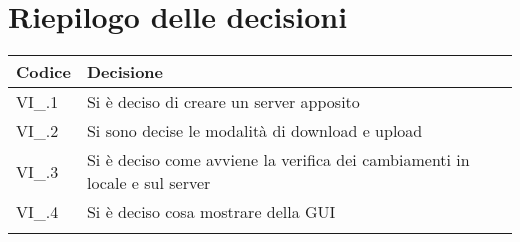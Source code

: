 \newpage

\section{Riepilogo delle decisioni \hfil}
{
	\setlength{\freewidth}{\dimexpr\textwidth-4\tabcolsep}
	\renewcommand{\arraystretch}{1.5}
	\setlength{\aboverulesep}{0pt}
	\setlength{\belowrulesep}{0pt}
	\begin{longtable}{L{.3\freewidth} L{.7\freewidth}}
		\toprule 
		\textbf{Codice} & \textbf{Decisione}\\
		\toprule
		\endhead
		
		VI\_\DataMeeting{}.1 & Si è deciso di creare un server apposito  \\
		VI\_\DataMeeting{}.2 & Si sono decise le modalità di download e upload\\
		VI\_\DataMeeting{}.3 & Si è deciso come avviene la verifica dei cambiamenti in locale e sul server\\
		VI\_\DataMeeting{}.4 & Si è deciso cosa mostrare della GUI\\
		
		\bottomrule
		\hiderowcolors
	\end{longtable}
}